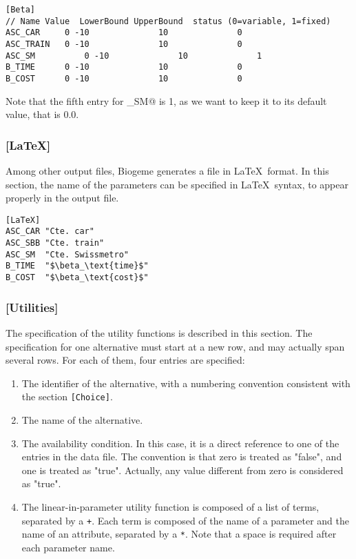 \documentclass[12pt]{memoir}
\begin{document}
{\footnotesize
\begin{verbatim}
[Beta]
// Name Value  LowerBound UpperBound  status (0=variable, 1=fixed)
ASC_CAR 	0 -10              10              0
ASC_TRAIN  	0 -10              10              0
ASC_SM	        0 -10              10              1
B_TIME		0 -10              10              0
B_COST		0 -10              10              0
\end{verbatim}
}
Note that the fifth entry  for \verb@ASC_SM@ is 1, as we want to keep it  to its default value, that is 0.0.

\subsubsection{[LaTeX]}

Among other  output files, Biogeme generates a file in \LaTeX\ format. In this section, the name of the parameters can be specified in \LaTeX\ syntax, to appear properly in the output file.

{\footnotesize
\begin{verbatim}
[LaTeX]
ASC_CAR "Cte. car"
ASC_SBB "Cte. train"
ASC_SM	"Cte. Swissmetro"
B_TIME	"$\beta_\text{time}$"
B_COST	"$\beta_\text{cost}$"
\end{verbatim}
}

\subsubsection{[Utilities]}

The specification of the
utility functions is described in this section. The specification for one alternative
must start at a new row, and may actually span several rows. 
For each of them, four entries are specified:
\begin{enumerate}
\item The identifier of the alternative, with a numbering convention
  consistent with the section \texttt{[Choice]}.
\item The name of the alternative.
\item The availability condition. In this case, it is a direct
reference to one of the entries  in the data file. The convention is that zero is treated as "false", and one is treated as "true". Actually, any value different from zero is considered as "true".
\item  The linear-in-parameter utility function is composed of a list of terms,
         separated by a \texttt{+}. Each term is composed of the name of a
         parameter and the name of an attribute,
         separated by a \texttt{*}.          Note that a space is
required  after each parameter name.
\end{enumerate}
\end{document}
